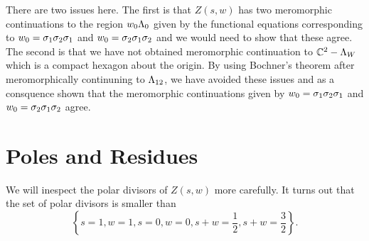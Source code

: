 \documentclass[12pt,reqno,oneside]{amsart}
\begin{document}
    There are two issues here. The first is that $Z(s,w)$ has two meromorphic continuations to the region $w_{0}\Lambda_{0}$ given by the functional equations corresponding to $w_{0} = \sigma_{1}\sigma_{2}\sigma_{1}$ and $w_{0} = \sigma_{2}\sigma_{1}\sigma_{2}$ and we would need to show that these agree. The second is that we have not obtained meromorphic continuation to $\mathbb{C}^{2}-\Lambda_{W}$ which is a compact hexagon about the origin. By using Bochner's theorem after meromorphically continuning to $\Lambda_{12}$, we have avoided these issues and as a consquence shown that the meromorphic continuations given by $w_{0} = \sigma_{1}\sigma_{2}\sigma_{1}$ and $w_{0} = \sigma_{2}\sigma_{1}\sigma_{2}$ agree.
\section{Poles and Residues}
    We will inespect the polar divisors of $Z(s,w)$ more carefully. It turns out that the set of polar divisors is smaller than
    \[
        \left\{s = 1, w = 1, s = 0, w = 0, s+w = \frac{1}{2}, s+w = \frac{3}{2}\right\}.
    \]
\end{document}
